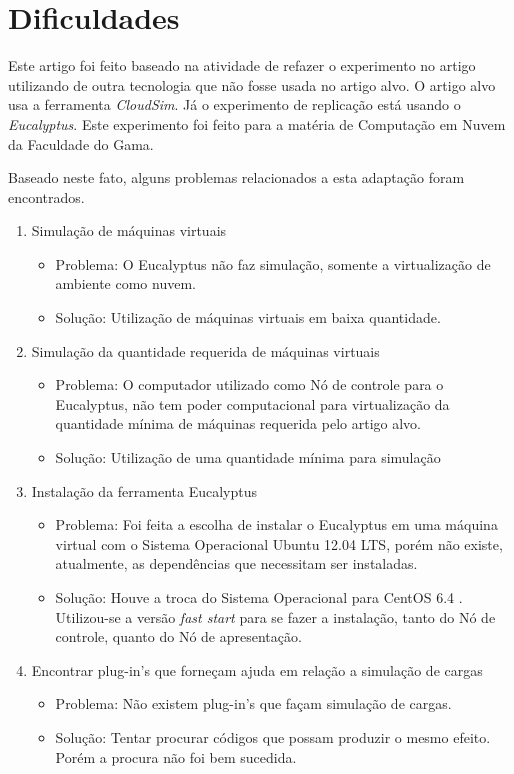 \section{Dificuldades}
\label{sec:dificuldades}

Este artigo foi feito baseado na atividade de refazer o experimento no artigo \cite{elaine_et_al:14} utilizando de outra tecnologia que não fosse usada no artigo alvo. O artigo alvo usa a ferramenta \textit{CloudSim}. Já o experimento de replicação está usando o \textit{Eucalyptus}. Este experimento foi feito para a matéria de Computação em Nuvem da Faculdade do Gama.

Baseado neste fato, alguns problemas relacionados a esta adaptação foram encontrados.

\begin{enumerate}

  \item Simulação de máquinas virtuais
  \begin{itemize}
    \item Problema: O Eucalyptus não faz simulação, somente a virtualização de ambiente como nuvem.
    \item Solução: Utilização de máquinas virtuais em baixa quantidade.
  \end{itemize}

  \item Simulação da quantidade requerida de máquinas virtuais
  \begin{itemize}
    \item Problema: O computador utilizado como Nó de controle para o Eucalyptus, não tem poder computacional para virtualização da quantidade mínima de máquinas requerida pelo artigo alvo.
    \item Solução: Utilização de uma quantidade mínima para simulação
  \end{itemize}

  \item Instalação da ferramenta Eucalyptus
  \begin{itemize}
    \item Problema: Foi feita a escolha de instalar o Eucalyptus em uma máquina virtual com o Sistema Operacional Ubuntu 12.04 LTS, porém não existe, atualmente, as dependências que necessitam ser instaladas.
    \item Solução: Houve a troca do Sistema Operacional para CentOS 6.4 . Utilizou-se a versão \textit{fast start} para se fazer a instalação, tanto do Nó de controle, quanto do Nó de apresentação.
  \end{itemize}


  \item Encontrar plug-in's que forneçam ajuda em relação a simulação de cargas
  \begin{itemize}
    \item Problema: Não existem plug-in's que façam simulação de cargas.
    \item Solução: Tentar procurar códigos que possam produzir o mesmo efeito. Porém a procura não foi bem sucedida.
  \end{itemize}



\end{enumerate}


